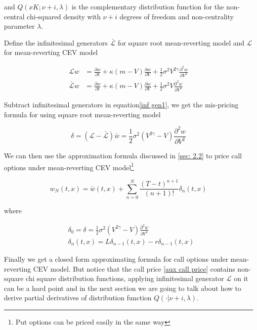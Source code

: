 \noindent and $Q(xK ; \nu+i, \lambda)$ is the complementary distribution function for the non-central chi-squared density with $\nu + i$ degrees of freedom and non-centrality parameter $\lambda$.

Define the infinitesimal generators $\bar{\mathcal{L}}$ for square root mean-reverting model and $\mathcal{L}$ for mean-reverting CEV model

\begin{equation}\label{inf gen1}
    \begin{aligned}
        \mathcal{L} w&= \frac{\partial w}{\partial t}+\kappa(m - V) \frac{\partial w}{\partial V}+\frac{1}{2} \sigma^{2} V^{2\gamma} \frac{\partial^{2} w}{\partial V^{2}} \\
        \bar{\mathcal{L}} w &= \frac{\partial w}{\partial t}+\kappa(m - V) \frac{\partial w}{\partial V}+\frac{1}{2} \sigma^{2} V \frac{\partial^{2} w}{\partial V^{2}}
    \end{aligned}
\end{equation}

Subtract infinitesimal generators in equation\eqref{inf gen1}, we get the mis-pricing formula for using square root mean-reverting model

$$
\delta = (\mathcal{L} - \bar{\mathcal{L}}) \bar{w} = \frac{1}{2} \sigma^{2} (V^{2\gamma} - V) \frac{\partial^{2} w}{\partial V^{2}}
$$

\noindent We can then use the approximation formula discussed in \ref{sec: 2.2} to price call options under mean-reverting CEV model\footnote{Put options can be priced easily in the same way}

\begin{equation} \label{cev approx formula}
    w_{N}(t, x)=\bar{w}(t,x)+\sum_{n=0}^{N} \frac{(T-t)^{n+1}}{(n+1) !} \delta_{n}(t, x)
\end{equation}

\noindent where

\begin{equation}\label{mispricing}
    \begin{aligned}
        &\delta_0 = \delta = \frac{1}{2} \sigma^{2} (V^{2\gamma} - V) \frac{\partial^{2} w}{\partial V^{2}} \\
        &\delta_{n}(t, x)=L \delta_{n-1}(t, x)- r\delta_{n-1}(t, x)
        \end{aligned}
\end{equation}

Finally we get a closed form approximating formula for call options under mean-reverting CEV model. But notice that the call price \eqref{aux call price} contains non-square chi square distribution functions, applying infinitesimal generator $\mathcal{L}$ on it can be a hard point and in the next section we are going to talk about how to derive partial derivatives of distribution function $Q(\cdot | \nu+i, \lambda)$.

